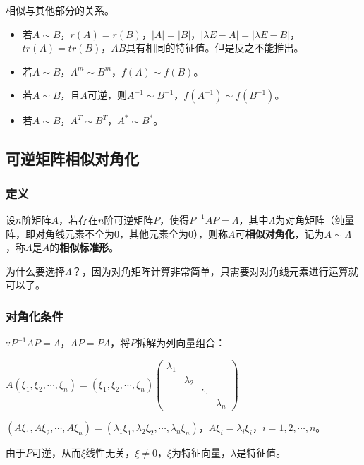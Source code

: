 \documentclass[UTF8, 12pt]{ctexart}
\begin{document}
相似与其他部分的关系。

\begin{itemize}
    \item 若$A\sim B$，$r(A)=r(B)$，$\vert A\vert=\vert B\vert$，$\vert\lambda E-A\vert=\vert\lambda E-B\vert$，$tr(A)=tr(B)$，$AB$具有相同的特征值。但是反之不能推出。
    \item 若$A\sim B$，$A^m\sim B^m$，$f(A)\sim f(B)$。
    \item 若$A\sim B$，且$A$可逆，则$A^{-1}\sim B^{-1}$，$f(A^{-1})\sim f(B^{-1})$。
    \item 若$A\sim B$，$A^T\sim B^T$，$A^*\sim B^*$。
\end{itemize}

\subsection{可逆矩阵相似对角化}

\subsubsection{定义}

设$n$阶矩阵$A$，若存在$n$阶可逆矩阵$P$，使得$P^{-1}AP=\Lambda$，其中$\Lambda$为对角矩阵（纯量阵，即对角线元素不全为0，其他元素全为0），则称$A$可\textbf{相似对角化}，记为$A\sim\Lambda$，称$\Lambda$是$A$的\textbf{相似标准形}。

为什么要选择$\Lambda$？，因为对角矩阵计算非常简单，只需要对对角线元素进行运算就可以了。

\subsubsection{对角化条件}

$\because P^{-1}AP=\Lambda$，$AP=P\Lambda$，将$P$拆解为列向量组合：

$A(\xi_1,\xi_2,\cdots,\xi_n)=(\xi_1,\xi_2,\cdots,\xi_n)\left(\begin{array}{cccc}
    \lambda_1 \\
     & \lambda_2 \\
     & & \ddots \\
     & & & \lambda_n
\end{array}\right)$

$(A\xi_1,A\xi_2,\cdots,A\xi_n)=(\lambda_1\xi_1,\lambda_2\xi_2,\cdots,\lambda_n\xi_n)$，$A\xi_i=\lambda_i\xi_i$，$i=1,2,\cdots,n$。

由于$P$可逆，从而$\xi$线性无关，$\xi\neq0$，$\xi$为特征向量，$\lambda$是特征值。
\end{document}
